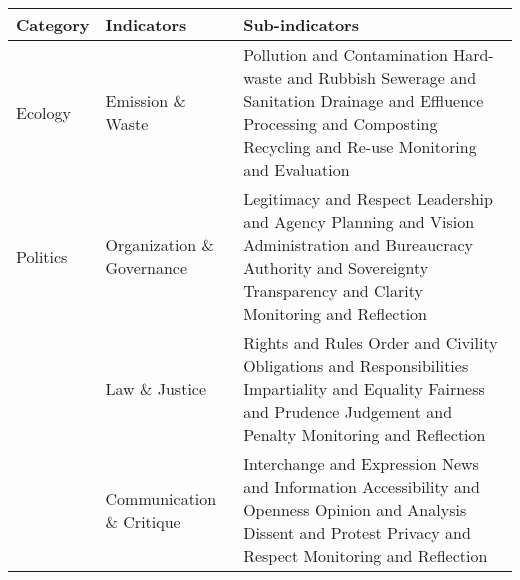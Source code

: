 \begin{table}[th]
\begin{center}
\begin{tabular}{ >{\raggedright\arraybackslash}p{} >{\raggedright\arraybackslash}p{} >{\raggedright\arraybackslash}p{} }
\hline
Category & Indicators & Sub-indicators \\
\hline
Ecology & Emission \& Waste & Pollution and Contamination \linebreak Hard-waste and Rubbish \linebreak Sewerage and Sanitation \linebreak Drainage and Effluence \linebreak Processing and Composting \linebreak Recycling and Re-use \linebreak Monitoring and Evaluation \linebreak \\
\hline
Politics & Organization \& Governance & Legitimacy and Respect \linebreak Leadership and Agency \linebreak Planning and Vision \linebreak Administration and Bureaucracy \linebreak Authority and Sovereignty \linebreak Transparency and Clarity \linebreak Monitoring and Reflection \linebreak \\
  & Law \& Justice & Rights and Rules \linebreak Order and Civility \linebreak Obligations and Responsibilities \linebreak Impartiality and Equality \linebreak Fairness and Prudence \linebreak Judgement and Penalty \linebreak Monitoring and Reflection \linebreak \\
  & Communication \& Critique & Interchange and Expression \linebreak News and Information \linebreak Accessibility and Openness \linebreak Opinion and Analysis \linebreak Dissent and Protest \linebreak Privacy and Respect \linebreak Monitoring and Reflection \linebreak \\

\end{tabular}
\end{center}
\end{table}
